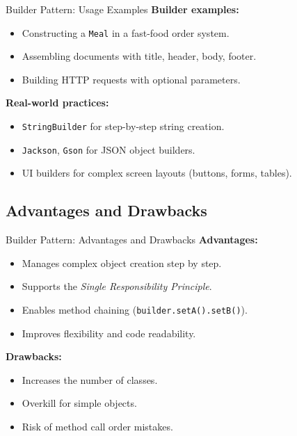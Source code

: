 \documentclass[aspectratio=169, table]{beamer}
\begin{document}
\begin{frame}[fragile]{Builder Pattern: Usage Examples}
\vspace{20pt}
\textbf{Builder examples:}
\begin{itemize}
\item Constructing a \texttt{Meal} in a fast-food order system.
\item Assembling documents with title, header, body, footer.
\item Building HTTP requests with optional parameters.
\end{itemize}

\vspace{10pt}
\textbf{Real-world practices:}
\begin{itemize}
\item \texttt{StringBuilder} for step-by-step string creation.
\item \texttt{Jackson}, \texttt{Gson} for JSON object builders.
\item UI builders for complex screen layouts (buttons, forms, tables).
\end{itemize}
\end{frame}

\subsection{Advantages and Drawbacks}

\begin{frame}[fragile]{Builder Pattern: Advantages and Drawbacks}
\vspace{20pt}
\textbf{Advantages:}
\begin{itemize}
\item Manages complex object creation step by step.
\item Supports the \textit{Single Responsibility Principle}.
\item Enables method chaining (\texttt{builder.setA().setB()}).
\item Improves flexibility and code readability.
\end{itemize}

\vspace{10pt}
\textbf{Drawbacks:}
\begin{itemize}
\item Increases the number of classes.
\item Overkill for simple objects.
\item Risk of method call order mistakes.
\end{itemize}
\end{frame}
\end{document}
